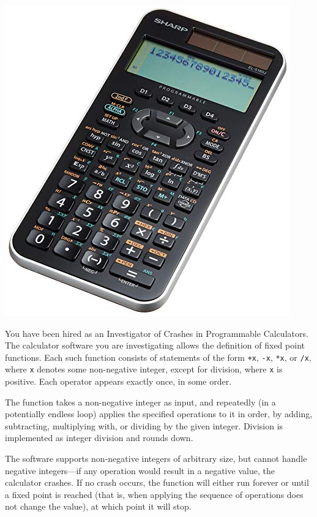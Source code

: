 
\begin{center}
\includegraphics[scale=0.2]{calculator.jpg}
\end{center}

You have been hired as an Investigator of Crashes in Programmable Calculators.
The calculator software you are investigating allows the definition of fixed point functions.
Each such function consists of statements of the form \texttt{+x}, \texttt{-x}, \texttt{*x}, or \texttt{/x}, where \texttt{x} denotes some non-negative integer, except for division, where \texttt{x} is positive. Each operator appears exactly once, in some order.

The function takes a non-negative integer as input, and repeatedly (in a potentially endless loop) applies the specified operations to it in order, by adding, subtracting, multiplying with, or dividing by the given integer. Division is implemented as integer division and rounds down.

The software supports non-negative integers of arbitrary size, but cannot handle negative integers---if any operation would result in a negative value, the calculator crashes.
If no crash occurs, the function will either run forever or until a fixed point is reached (that is, when applying the sequence of operations does not change the value), at which point it will stop.

